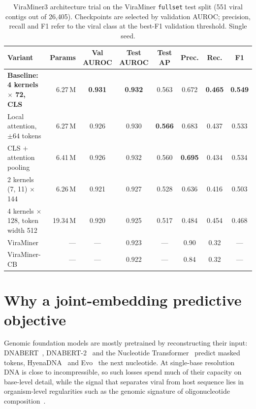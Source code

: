 \documentclass[10pt,twocolumn,a4paper]{article}
\begin{document}
\begin{table}[t]
\centering
\caption{ViraMiner3 architecture trial on the ViraMiner \texttt{fullset} test
split (551 viral contigs out of 26{,}405). Checkpoints are selected by validation
AUROC; precision, recall and F1 refer to the viral class at the best-F1
validation threshold. Single seed.}
\label{tab:vm3}
\footnotesize
\begin{tabular}{lrcccccc}
\toprule
Variant & Params & Val AUROC & Test AUROC & Test AP & Prec. & Rec. & F1 \\
\midrule
\textbf{Baseline: 4 kernels $\times$ 72, CLS} & 6.27\,M & \textbf{0.931} & \textbf{0.932} & 0.563 & 0.672 & \textbf{0.465} & \textbf{0.549} \\
Local attention, $\pm64$ tokens            & 6.27\,M & 0.926 & 0.930 & \textbf{0.566} & 0.683 & 0.437 & 0.533 \\
CLS $+$ attention pooling                  & 6.41\,M & 0.926 & 0.932 & 0.560 & \textbf{0.695} & 0.434 & 0.534 \\
2 kernels (7, 11) $\times$ 144             & 6.26\,M & 0.921 & 0.927 & 0.528 & 0.636 & 0.416 & 0.503 \\
4 kernels $\times$ 128, token width 512    & 19.34\,M & 0.920 & 0.925 & 0.517 & 0.484 & 0.454 & 0.468 \\
\midrule
ViraMiner~\cite{tampuu2019viraminer}       & --- & --- & 0.923 & --- & 0.90 & 0.32 & --- \\
ViraMiner-CB~\cite{pivotto2024viraminercb} & --- & --- & 0.922 & --- & 0.84 & 0.32 & --- \\
\bottomrule
\end{tabular}
\end{table}

\section{Why a joint-embedding predictive objective}\label{sec:why}

Genomic foundation models are mostly pretrained by reconstructing their input:
DNABERT~\cite{ji2021dnabert}, DNABERT-2~\cite{zhou2024dnabert2} and the
Nucleotide Transformer~\cite{dallatorre2025nt} predict masked tokens,
HyenaDNA~\cite{nguyen2023hyenadna} and Evo~\cite{nguyen2024evo} the next
nucleotide. At single-base resolution DNA is close to incompressible, so such
losses spend much of their capacity on base-level detail, while the signal that
separates viral from host sequence lies in organism-level regularities such as
the genomic signature of oligonucleotide
composition~\cite{karlin1995signature}.
\end{document}
